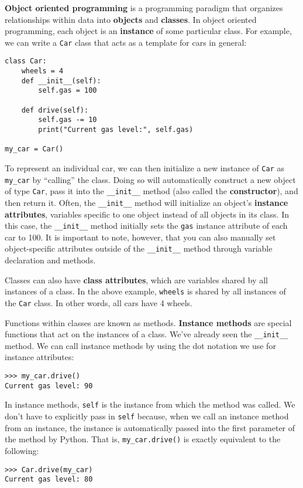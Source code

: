 \textbf{Object oriented programming} is a programming paradigm that organizes relationships within data into \textbf{objects} and \textbf{classes}. In object oriented programming, each object is an \textbf{instance} of some particular class. For example, we can write a \lstinline{Car} class that acts as a template for cars in general: 

\begin{lstlisting}
class Car:
    wheels = 4
    def __init__(self):
        self.gas = 100

    def drive(self):
        self.gas -= 10
        print("Current gas level:", self.gas)

my_car = Car()
\end{lstlisting}

To represent an individual car, we can then initialize a new instance of \lstinline{Car} as \lstinline{my_car} by ``calling'' the class. Doing so will automatically construct a new object of type \lstinline{Car}, pass it into the \lstinline{__init__} method (also called the \textbf{constructor}), and then return it. Often, the \lstinline{__init__} method will initialize an object's \textbf{instance attributes}, variables specific to one object instead of all objects in its class. In this case, the \lstinline{__init__} method initially sets the \lstinline{gas} instance attribute of each car to 100. 
It is important to note, however, that you can also manually set object-specific attributes outside of the \lstinline{__init__} method through variable declaration and methods.

Classes can also have \textbf{class attributes}, which are variables shared by all instances of a class. In the above example, \lstinline{wheels} is shared by all instances of the \lstinline{Car} class. In other words, all cars have 4 wheels. 

Functions within classes are known as methods. \textbf{Instance methods} are special functions that act on the instances of a class. We've already seen the \lstinline{__init__} method. We can call instance methods by using the dot notation we use for instance attributes: 
\begin{lstlisting}
>>> my_car.drive()
Current gas level: 90
\end{lstlisting}
In instance methods, \lstinline{self} is the instance from which the method was called.  We don’t have to explicitly pass in \lstinline{self} because, when we call an instance method from an instance, the instance is automatically passed into the first parameter of the method by Python. That is, \lstinline{my_car.drive()} is exactly equivalent to the following: 
\begin{lstlisting}
>>> Car.drive(my_car)
Current gas level: 80
\end{lstlisting}

